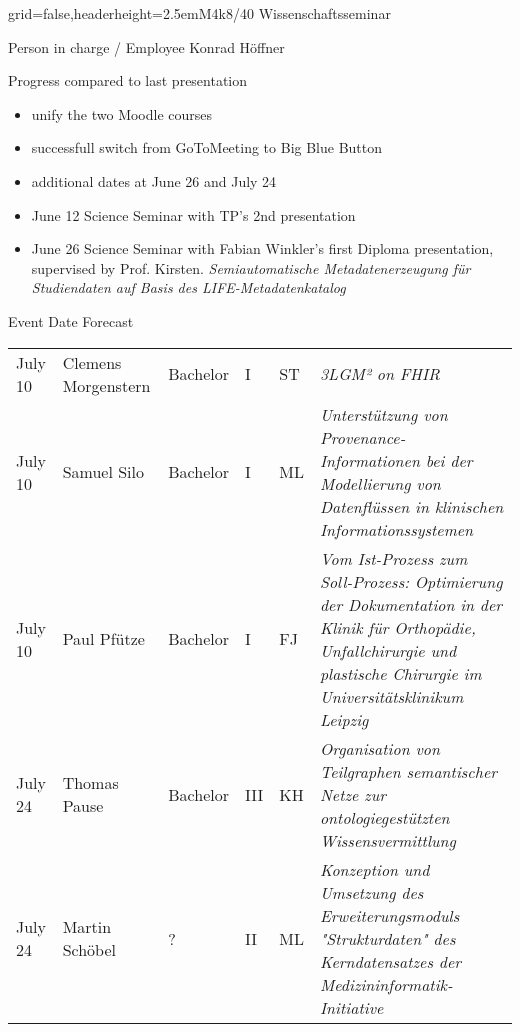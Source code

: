 \documentclass[english]{kiesgrube}
\begin{document}
\begin{poster}{grid=false,headerheight=2.5em}{}{M4k8/40 Wissenschaftsseminar}{}{}
\begin{posterbox}[name=person,column=0,row=0]{Person in charge / Employee}
Konrad Höffner
\end{posterbox}
\begin{posterbox}[name=progress,below=person]{Progress compared to last presentation}
\footnotesize
\begin{itemize}
\item unify the two Moodle courses
\item successfull switch from GoToMeeting to Big Blue Button
\item additional dates at June 26 and July 24
\item June 12 	Science Seminar with TP's 2nd presentation
\item June 26 	Science Seminar with Fabian Winkler's first Diploma presentation, supervised by Prof. Kirsten. \emph{Semiautomatische Metadatenerzeugung für Studiendaten auf Basis des LIFE-Metadatenkatalog}
\end{itemize}
\end{posterbox}
\begin{posterbox}[name=event,below=progress,span=2]{Event Date Forecast}
\small
\begin{tabulary}{\textwidth}{lllllL}
July 10	&Clemens Morgenstern		&Bachelor	&I		&ST	&\emph{3LGM² on FHIR}\\
July 10	&Samuel Silo			&Bachelor	&I		&ML	&\emph{Unterstützung von Provenance-Informationen bei der Modellierung von Datenflüssen in klinischen Informationssystemen}\\
July 10	&Paul Pfütze			&Bachelor	&I		&FJ	&\emph{Vom Ist-Prozess zum Soll-Prozess: Optimierung der Dokumentation in der Klinik für Orthopädie, Unfallchirurgie und plastische Chirurgie im Universitätsklinikum Leipzig}\\
July 24 &Thomas Pause			&Bachelor	&III		&KH	&\emph{Organisation von Teilgraphen semantischer Netze zur ontologiegestützten Wissensvermittlung}\\
July 24 &Martin Schöbel			&?		&II		&ML	&\emph{Konzeption und Umsetzung des Erweiterungsmoduls "Strukturdaten" des Kerndatensatzes der Medizininformatik-Initiative}\\

\end{tabulary}
\end{posterbox}
\end{poster}
\end{document}
